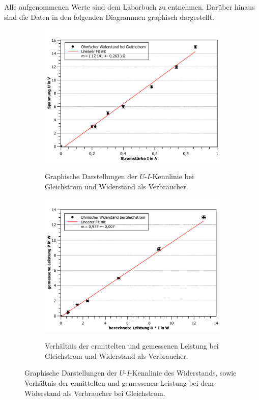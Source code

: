Alle aufgenommenen Werte sind dem Laborbuch zu entnehmen. 
Darüber hinaus sind die Daten in den folgenden Diagrammen graphisch dargestellt.
\begin{figure}[ht]
	
	\centering	
	\begin{subfigure}{0.70\textwidth}
		\centering
		\includegraphics[width=\textwidth]{auswertung/widerstand_gleichstrom_Widerstand.pdf}
		\label{fig:1}
		\caption{Graphische Darstellungen der $U$-$I$-Kennlinie bei Gleichstrom und Widerstand als Verbraucher.}	
	\end{subfigure}
	\begin{subfigure}{0.70\textwidth}
		\centering
		\includegraphics[width=\textwidth]{auswertung/widerstand_gleichstrom_Leistung.pdf}
		\label{fig:2}
		\caption{Verhältnis der ermittelten und gemessenen Leistung bei Gleichstrom und Widerstand als Verbraucher.}	
	\end{subfigure}
	\caption{Graphische Darstellungen der $U$-$I$-Kennlinie des Widerstands, sowie Verhältnis der ermittelten und gemessenen Leistung bei dem Widerstand als Verbraucher bei Gleichstrom.}
	\label{fig:R_gleich}
\end{figure}

